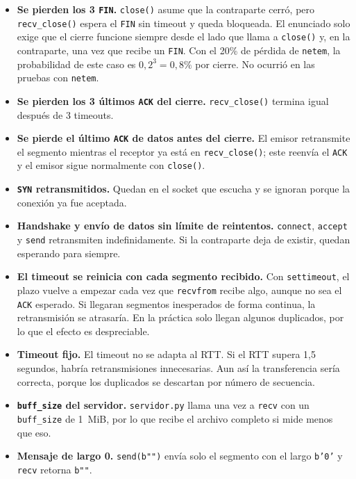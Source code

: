 \documentclass[11pt,letterpaper]{article}
\begin{document}
\begin{itemize}
  \item \textbf{Se pierden los 3 \texttt{FIN}.} \texttt{close()} asume que la contraparte
        cerró, pero \texttt{recv\_close()} espera el \texttt{FIN} sin timeout y queda
        bloqueada. El enunciado solo exige que el cierre funcione siempre desde el lado
        que llama a \texttt{close()} y, en la contraparte, una vez que recibe un
        \texttt{FIN}. Con el 20\% de pérdida de \texttt{netem}, la probabilidad de este caso
        es $0{,}2^3 = 0{,}8\%$ por cierre. No ocurrió en las pruebas con \texttt{netem}.
  \item \textbf{Se pierden los 3 últimos \texttt{ACK} del cierre.} \texttt{recv\_close()}
        termina igual después de 3 timeouts.
  \item \textbf{Se pierde el último \texttt{ACK} de datos antes del cierre.} El emisor
        retransmite el segmento mientras el receptor ya está en \texttt{recv\_close()};
        este reenvía el \texttt{ACK} y el emisor sigue normalmente con \texttt{close()}.
  \item \textbf{\texttt{SYN} retransmitidos.} Quedan en el socket que escucha y se
        ignoran porque la conexión ya fue aceptada.
  \item \textbf{Handshake y envío de datos sin límite de reintentos.} \texttt{connect},
        \texttt{accept} y \texttt{send} retransmiten indefinidamente. Si la contraparte
        deja de existir, quedan esperando para siempre.
  \item \textbf{El timeout se reinicia con cada segmento recibido.} Con
        \texttt{settimeout}, el plazo vuelve a empezar cada vez que \texttt{recvfrom}
        recibe algo, aunque no sea el \texttt{ACK} esperado. Si llegaran segmentos
        inesperados de forma continua, la retransmisión se atrasaría. En la práctica solo
        llegan algunos duplicados, por lo que el efecto es despreciable.
  \item \textbf{Timeout fijo.} El timeout no se adapta al RTT. Si el RTT supera 1,5
        segundos, habría retransmisiones innecesarias. Aun así la transferencia sería
        correcta, porque los duplicados se descartan por número de secuencia.
  \item \textbf{\texttt{buff\_size} del servidor.} \texttt{servidor.py} llama una vez a
        \texttt{recv} con un \texttt{buff\_size} de 1~MiB, por lo que recibe el archivo
        completo si mide menos que eso.
  \item \textbf{Mensaje de largo 0.} \texttt{send(b"")} envía solo el segmento con el
        largo \texttt{b'0'} y \texttt{recv} retorna \texttt{b""}.
\end{itemize}
\end{document}
